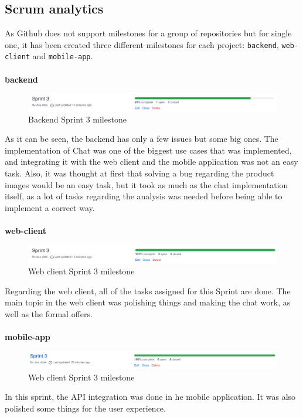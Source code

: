 \documentclass[./main.tex]{subfiles}
\begin{document}
\subsection{Scrum analytics}
As Github does not support milestones for a group of repositories but for single one, it has been created three different milestones for each project: \texttt{backend}, \texttt{web-client} and \texttt{mobile-app}.
\\
\\
\textbf{backend}
\begin{figure}[H]
	\centering
	\includegraphics[width=15cm]{img/sprint3-backend.png}
	\caption{Backend Sprint 3 milestone}
\end{figure}
As it can be seen, the backend has only a few issues but some big ones. The implementation of Chat was one of the biggest use cases that was implemented, and integrating it with the web client and the mobile application was not an easy task. Also, it was thought at first that solving a bug regarding the product images would be an easy task, but it took as much as the chat implementation itself, as a lot of tasks regarding the analysis was needed before being able to implement a correct way.
\\
\\
\textbf{web-client}
\begin{figure}[H]
	\centering
	\includegraphics[width=15cm]{img/sprint3-web.png}
	\caption{Web client Sprint 3 milestone}
\end{figure}
Regarding the web client, all of the tasks assigned for this Sprint are done.  The main topic in the web client was polishing things and making the chat work, as well as the formal offers.
\\\\
\textbf{mobile-app}
\begin{figure}[H]
	\centering
	\includegraphics[width=15cm]{img/sprint3-mobile.png}
	\caption{Web client Sprint 3 milestone}
\end{figure}
In this sprint, the API integration was  done in he mobile application. It was also polished some things for the user experience.
\end{document}
